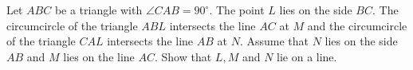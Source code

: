 Let $ABC$ be a triangle with $\angle CAB = 90^\circ $. The point $L$ lies on the side $BC$. 
The circumcircle of the triangle $ABL$ intersects the line $AC$ at $M$ and the circumcircle
of the triangle $CAL$ intersects the line $AB$ at $N$.
Assume that $N$ lies on the side $AB$ and $M$ lies on the line $AC$.
Show that $L, M$ and $N$ lie on a line.